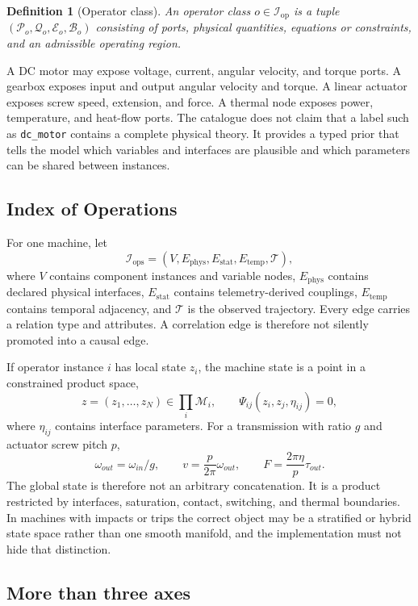 \documentclass[11pt]{article}
\newtheorem{definition}{Definition}
\newcommand{\Iop}{\mathcal{I}_{\mathrm{op}}}
\newcommand{\Iops}{\mathcal{I}_{\mathrm{ops}}}
\begin{document}
\begin{definition}[Operator class]
An operator class $o\in\Iop$ is a tuple $(\mathcal{P}_o,\mathcal{Q}_o,\mathcal{E}_o,\mathcal{B}_o)$ consisting of ports, physical quantities, equations or constraints, and an admissible operating region.
\end{definition}

A DC motor may expose voltage, current, angular velocity, and torque ports. A gearbox exposes input and output angular velocity and torque. A linear actuator exposes screw speed, extension, and force. A thermal node exposes power, temperature, and heat-flow ports. The catalogue does not claim that a label such as \texttt{dc\_motor} contains a complete physical theory. It provides a typed prior that tells the model which variables and interfaces are plausible and which parameters can be shared between instances.

\subsection{Index of Operations}

For one machine, let
\[
\Iops=(V,E_{\mathrm{phys}},E_{\mathrm{stat}},E_{\mathrm{temp}},\mathcal{T}),
\]
where $V$ contains component instances and variable nodes, $E_{\mathrm{phys}}$ contains declared physical interfaces, $E_{\mathrm{stat}}$ contains telemetry-derived couplings, $E_{\mathrm{temp}}$ contains temporal adjacency, and $\mathcal{T}$ is the observed trajectory. Every edge carries a relation type and attributes. A correlation edge is therefore not silently promoted into a causal edge.

If operator instance $i$ has local state $z_i$, the machine state is a point in a constrained product space,
\[
 z=(z_1,\ldots,z_N)\in\prod_i\mathcal{M}_i,\qquad \Psi_{ij}(z_i,z_j,\eta_{ij})=0,
\]
where $\eta_{ij}$ contains interface parameters. For a transmission with ratio $g$ and actuator screw pitch $p$,
\[
\omega_{out}=\omega_{in}/g,\qquad v=\frac{p}{2\pi}\omega_{out},\qquad F=\frac{2\pi\eta}{p}\tau_{out}.
\]
The global state is therefore not an arbitrary concatenation. It is a product restricted by interfaces, saturation, contact, switching, and thermal boundaries. In machines with impacts or trips the correct object may be a stratified or hybrid state space rather than one smooth manifold, and the implementation must not hide that distinction.

\subsection{More than three axes}
\end{document}
